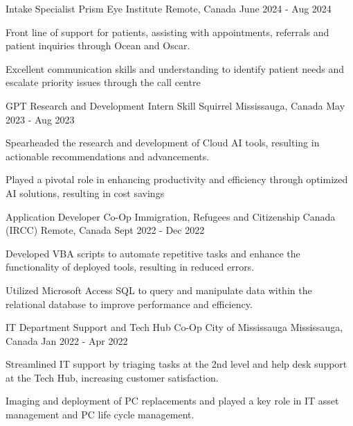 \begin{cventries}
\cventry
    {Intake Specialist}
    {Prism Eye Institute}
    {Remote, Canada}
    {June 2024 - Aug 2024}
    {
      \begin{cvitems}
        \item {Front line of support for patients, assisting with appointments, referrals and patient inquiries through Ocean and Oscar.}
        \item {Excellent communication skills and understanding to identify patient needs and escalate priority issues through the call centre}
      \end{cvitems}
    }
 \cventry
    {GPT Research and Development Intern}
    {Skill Squirrel}
    {Mississauga, Canada}
    {May 2023 - Aug 2023}
    {
      \begin{cvitems}
        \item {Spearheaded the research and development of Cloud AI tools, resulting in actionable recommendations and advancements.}
        \item {Played a pivotal role in enhancing productivity and efficiency through optimized AI solutions, resulting in cost savings}
      \end{cvitems}
    }
  \cventry
    {Application Developer Co-Op}
    {Immigration, Refugees and Citizenship Canada (IRCC)}
    {Remote, Canada}
    {Sept 2022 - Dec 2022}
    {
      \begin{cvitems}
        \item {Developed VBA scripts to automate repetitive tasks and enhance the functionality of deployed tools, resulting in reduced errors.}
        \item {Utilized Microsoft Access SQL to query and manipulate data within the relational database to improve performance and efficiency.}
      \end{cvitems}
    }
      \cventry
    {IT Department Support and Tech Hub Co-Op}
    {City of Mississauga}
    {Mississauga, Canada}
    {Jan 2022 - Apr 2022}
    {
      \begin{cvitems}
        \item {Streamlined IT support by triaging tasks at the 2nd level and help desk support at the Tech Hub, increasing customer satisfaction.}
        \item {Imaging and deployment of PC replacements and played a key role in IT asset management and PC life cycle management.}

\end{cvitems}}
\end{cventries}
